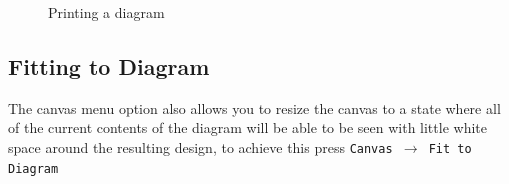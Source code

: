 \documentclass[a4paper]{article}
\begin{document}
{ \begin{figure}[H] \begin{center}
\caption{Printing a diagram} \vspace{-20pt} 
\end{center} \end{figure} 

\subsection{Fitting to Diagram} 
The canvas menu option also allows you to resize the canvas to a state where all of the current contents of the diagram will be able to be seen with little white space around the resulting design, to achieve this press \texttt{Canvas
$\rightarrow$ Fit to Diagram}
\begin{figure}[H] \begin{center}


\end{center}
\end{figure}}
\end{document}

